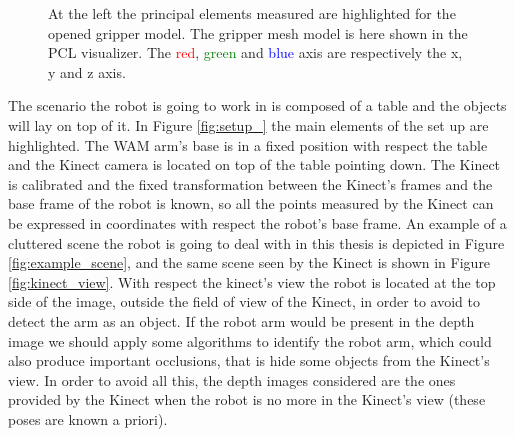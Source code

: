 \begin{figure}[htp]
\centering
\begin{subfigure}[t]{0.25\textwidth}
\centering
{}
\end{subfigure} 
\begin{subfigure}[t]{0.3\textwidth}
\centering
{}
\end{subfigure}
\hspace{1cm}
\begin{subfigure}[t]{0.3\textwidth}
\centering
{}
\end{subfigure}
\caption{At the left the principal elements measured are highlighted for the opened gripper model. The gripper mesh model is here shown in the PCL visualizer. The \textcolor{red}{red}, \textcolor{green}{green} and \textcolor{blue}{blue} axis are respectively the x, y and z axis. }\label{fig:gripper_modelling}
\end{figure}

The scenario the robot is going to work in is composed of a table and the objects will lay on top of it. In Figure \ref{fig:setup_} the main elements of the set up are highlighted. The WAM arm's base is in a fixed position with respect the table and the Kinect camera is located on top of the table pointing down. The Kinect is calibrated and the fixed transformation between the Kinect's frames and the base frame of the robot is known, so all the points measured by the Kinect can be expressed in coordinates with respect the robot's base frame. An example of a cluttered scene the robot is going to deal with in this thesis is depicted in Figure \ref{fig:example_scene}, and the same scene seen by the Kinect is shown in Figure \ref{fig:kinect_view}. With respect the kinect's view the robot is located at the top side of the image, outside the field of view of the Kinect, in order to avoid to detect the arm as an object. If the robot arm would be present in the depth image we should apply some algorithms to identify the robot arm, which could also produce important occlusions, that is hide some objects from the Kinect's view. In order to avoid all this, the depth images considered are the ones provided by the Kinect when the robot is no more in the Kinect's view (these poses are known a priori). 

